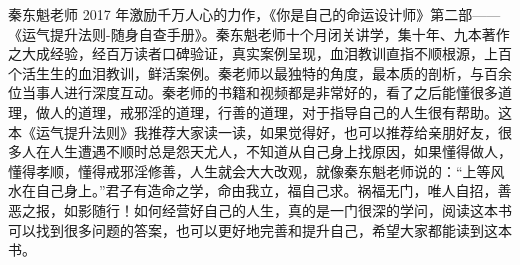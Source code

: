 \begin{book}
    秦东魁老师 2017 年激励千万人心的力作，《你是自己的命运设计师》第二部——《运气提升法则-随身自查手册》。秦东魁老师十个月闭关讲学，集十年、九本著作之大成经验，经百万读者口碑验证，真实案例呈现，血泪教训直指不顺根源，上百个活生生的血泪教训，鲜活案例。秦老师以最独特的角度，最本质的剖析，与百余位当事人进行深度互动。秦老师的书籍和视频都是非常好的，看了之后能懂很多道理，做人的道理，戒邪淫的道理，行善的道理，对于指导自己的人生很有帮助。这本《运气提升法则》我推荐大家读一读，如果觉得好，也可以推荐给亲朋好友，很多人在人生遭遇不顺时总是怨天尤人，不知道从自己身上找原因，如果懂得做人，懂得孝顺，懂得戒邪淫修善，人生就会大大改观，就像秦东魁老师说的：“上等风水在自己身上。”君子有造命之学，命由我立，福自己求。祸福无门，唯人自招，善恶之报，如影随行！如何经营好自己的人生，真的是一门很深的学问，阅读这本书可以找到很多问题的答案，也可以更好地完善和提升自己，希望大家都能读到这本书。
\end{book}

